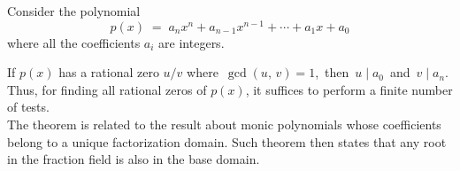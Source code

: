 \documentclass[12pt]{article}
\begin{document}
Consider the polynomial
$$p(x)\;=\; a_nx^n + a_{n-1}x^{n-1}+\cdots+a_1x+a_0$$
where all the coefficients $a_i$ are integers.

If $p(x)$ has a rational zero $u/v$ where\, $\gcd(u,\,v)=1$,\, then\,
$u\mid a_0$\, and\, $v\mid a_n$.\, Thus, for finding all rational zeros of $p(x)$, it suffices to perform a finite number of tests.\\

The theorem is related to the result about monic polynomials whose coefficients belong to a unique factorization domain. Such theorem then states that any root in the fraction field is also in the base domain.
\end{document}
